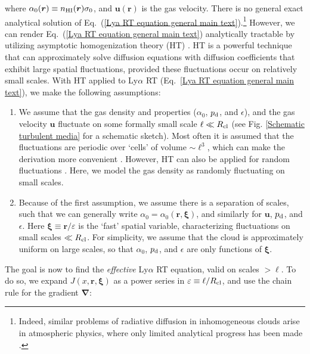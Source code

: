 \documentclass[fleqn,usenatbib]{mnras}
\begin{document}
where $\alpha_0(\boldsymbol{r}) \equiv n_{\rm HI} (\boldsymbol{r}) \sigma_0$, and $\boldsymbol{u}(\boldsymbol{r})$ is the gas velocity. There is no general exact analytical solution of Eq.~(\ref{Lya RT equation general main text}).\footnote{Indeed, similar problems of radiative diffusion in inhomogeneous clouds arise in atmospheric physics, where only limited analytical progress has been made \citep[for a review, see][]{Davis2001}.} However, we can render Eq.~(\ref{Lya RT equation general main text}) analytically tractable by utilizing asymptotic homogenization theory (HT) \citep[for good overviews, see e.g.][]{Zwillinger1992_Diffeqs, Holmes2013_Perturbation}. HT is a powerful technique that can approximately solve diffusion equations with diffusion coefficients that exhibit large spatial fluctuations, provided these fluctuations occur on relatively small scales. With HT applied to Ly$\alpha$ RT (Eq.~\ref{Lya RT equation general main text}), we make the following assumptions:
\begin{enumerate}
    \item We assume that the gas density and properties ($\alpha_0$, $p_{\rm d}$, and $\epsilon$), and the gas velocity $\boldsymbol{u}$ fluctuate on some formally small scale $\ell \ll R_{\rm cl}$ (see Fig. \ref{Schematic turbulent media} for a schematic sketch). Most often it is assumed that the fluctuations are periodic over `cells' of volume $\sim \ell^3$, which can make the derivation more convenient \citep[e.g.][]{Zwillinger1992_Diffeqs, Holmes2013_Perturbation}. However, HT can also be applied for random fluctuations \citep[e.g.][]{Kozlow1993_centrallimit, Hanasoge2013}. Here, we model the gas density as randomly fluctuating on small scales. \\

    \item Because of the first assumption, we assume there is a separation of scales, such that we can generally write $\alpha_0 = \alpha_0(\boldsymbol{r}, \boldsymbol{\xi})$, and similarly for $\boldsymbol{u}$, $p_{\rm d}$, and $\epsilon$. Here $\boldsymbol{\xi} \equiv \boldsymbol{r}/\varepsilon$ is the `fast' spatial variable, characterizing fluctuations on small scales $\ll R_{\rm cl}$. For simplicity, we assume that the cloud is approximately uniform on large scales, so that $\alpha_0$, $p_{\rm d}$, and $\epsilon$ are only functions of $\boldsymbol{\xi}$. 
\end{enumerate}
The goal is now to find the \textit{effective} Ly$\alpha$ RT equation, valid on scales $> \ell$. To do so, we expand $J(x,\boldsymbol{r}, \boldsymbol{\xi})$ as a power series in $\varepsilon \equiv \ell/R_{\rm cl}$, and use the chain rule for the gradient $\boldsymbol{\nabla}$:
\end{document}
